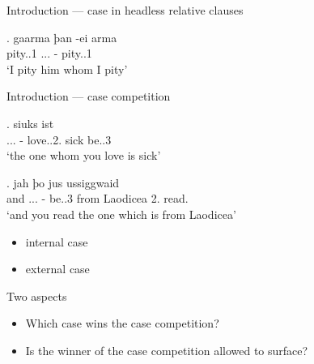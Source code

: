 \documentclass[xcolor=dvipsnames,10pt]{beamer}
\begin{document}
\begin{frame}{Introduction --- case in headless relative clauses}

\exg. gaarma þan -ei arma\\
 pity..1\scsub{[acc]} ... - pity..1\scsub{[acc]}\\
 `I pity him whom I pity' \label{ex:gothic-acc-acc}

\end{frame}

\begin{frame}{Introduction --- case competition}

\exg.    siuks ist\\
 ... - love..2.\scsub{[acc]} sick be..3\scsub{[nom]}\\
 `the one whom you love is sick' \label{ex:gothic-acc-nom}

\pause

\exg. jah þo     jus ussiggwaid\\
 and ... - be..3\scsub{[nom]} from Laodicea 2. read.\scsub{[acc]}\\
 `and you read the one which is from Laodicea' \label{ex:gothic-nom-acc}

 \pause

 \begin{itemize}
   \item internal case
   \item external case
 \end{itemize}


\end{frame}

\begin{frame}{Two aspects}

\begin{itemize}
  \pause\item Which case wins the case competition?
  \pause\item Is the winner of the case competition allowed to surface?
\end{itemize}

\end{frame}
\end{document}
